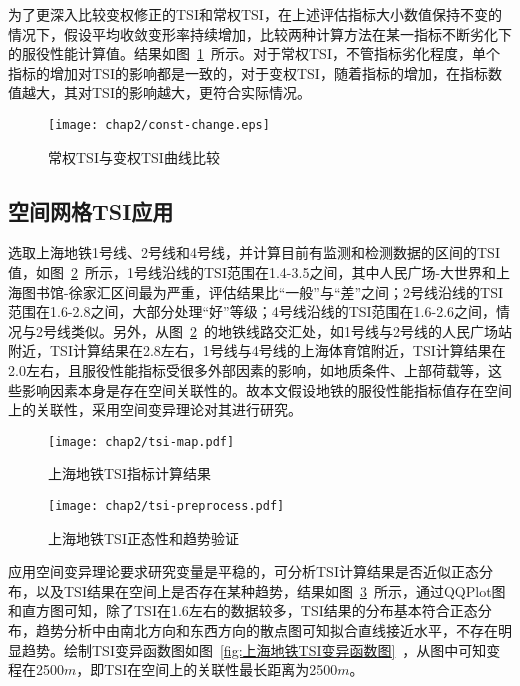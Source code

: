 为了更深入比较变权修正的TSI和常权TSI，在上述评估指标大小数值保持不变的情况下，假设平均收敛变形率持续增加，比较两种计算方法在某一指标不断劣化下的服役性能计算值。结果如图~\ref{fig:常权TSI与变权TSI曲线比较}~所示。对于常权TSI，不管指标劣化程度，单个指标的增加对TSI的影响都是一致的，对于变权TSI，随着指标的增加，在指标数值越大，其对TSI的影响越大，更符合实际情况。

\begin{figure}[htb!]
    \centering
    \texttt{[image: chap2/const-change.eps]}
    \caption{常权TSI与变权TSI曲线比较}
    \label{fig:常权TSI与变权TSI曲线比较}
\end{figure}

\subsection{空间网格TSI应用}

选取上海地铁1号线、2号线和4号线，并计算目前有监测和检测数据的区间的TSI值，如图~\ref{fig:上海地铁TSI指标计算结果}~所示，1号线沿线的TSI范围在1.4-3.5之间，其中人民广场-大世界和上海图书馆-徐家汇区间最为严重，评估结果比“一般”与“差”之间；2号线沿线的TSI范围在1.6-2.8之间，大部分处理“好”等级；4号线沿线的TSI范围在1.6-2.6之间，情况与2号线类似。另外，从图~\ref{fig:上海地铁TSI指标计算结果}~的地铁线路交汇处，如1号线与2号线的人民广场站附近，TSI计算结果在2.8左右，1号线与4号线的上海体育馆附近，TSI计算结果在2.0左右，且服役性能指标受很多外部因素的影响，如地质条件、上部荷载等，这些影响因素本身是存在空间关联性的。故本文假设地铁的服役性能指标值存在空间上的关联性，采用空间变异理论对其进行研究。

\begin{figure}[htb!]
    \centering
    \texttt{[image: chap2/tsi-map.pdf]}
    \caption{上海地铁TSI指标计算结果}
    \label{fig:上海地铁TSI指标计算结果}
\end{figure}

\begin{figure}[htb!]
    \centering
    \texttt{[image: chap2/tsi-preprocess.pdf]}
    \caption{上海地铁TSI正态性和趋势验证}
    \label{fig:上海地铁TSI正态性和趋势验证}
\end{figure}

应用空间变异理论要求研究变量是平稳的，可分析TSI计算结果是否近似正态分布，以及TSI结果在空间上是否存在某种趋势，结果如图~\ref{fig:上海地铁TSI正态性和趋势验证}~所示，通过QQPlot图和直方图可知，除了TSI在1.6左右的数据较多，TSI结果的分布基本符合正态分布，趋势分析中由南北方向和东西方向的散点图可知拟合直线接近水平，不存在明显趋势。绘制TSI变异函数图如图~\ref{fig:上海地铁TSI变异函数图}~，从图中可知变程在2500$m$，即TSI在空间上的关联性最长距离为2500$m$。

